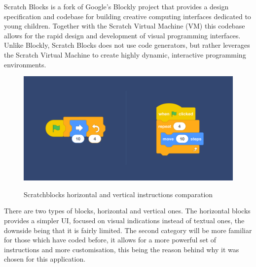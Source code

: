 \documentclass[12 pct]{report}
\begin{document}
Scratch Blocks is a fork of Google's Blockly project that provides a design specification and codebase for building creative computing interfaces dedicated to young children. Together with the Scratch Virtual Machine (VM) this codebase allows for the rapid design and development of visual programming interfaces. Unlike Blockly, Scratch Blocks does not use code generators, but rather leverages the Scratch Virtual Machine to create highly dynamic, interactive programming environments.

\begin{figure}[H]
\includegraphics[width=1.0\textwidth]{scratchblocks}
\centering
\label{fig:hololens}
\caption{Scratchblocks horizontal and vertical instructions comparation}
\end{figure}

There are two types of blocks, horizontal and vertical ones. The horizontal blocks provides a simpler UI, focused on visual indications instead of textual ones, the downside being that it is fairly limited. The second category will be more familiar for those which have coded before, it allows for a more powerful set of instructions and more customisation, this being the reason behind why it was chosen for this application.
\end{document}
